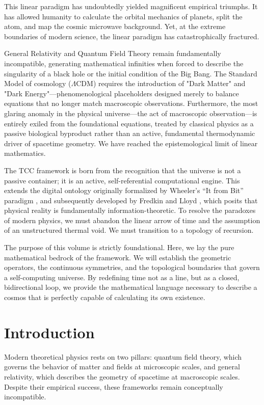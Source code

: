 \documentclass[12pt,openany]{book}
\theoremstyle{plain}
\theoremstyle{definition}
\theoremstyle{remark}
\begin{document}
This linear paradigm has undoubtedly yielded magnificent empirical triumphs. It has allowed humanity to calculate the orbital mechanics of planets, split the atom, and map the cosmic microwave background. Yet, at the extreme boundaries of modern science, the linear paradigm has catastrophically fractured.

General Relativity and Quantum Field Theory remain fundamentally incompatible, generating mathematical infinities when forced to describe the singularity of a black hole or the initial condition of the Big Bang. The Standard Model of cosmology ($\Lambda$CDM) requires the introduction of "Dark Matter" and "Dark Energy"---phenomenological placeholders designed merely to balance equations that no longer match macroscopic observations. Furthermore, the most glaring anomaly in the physical universe---the act of macroscopic observation---is entirely exiled from the foundational equations, treated by classical physics as a passive biological byproduct rather than an active, fundamental thermodynamic driver of spacetime geometry. We have reached the epistemological limit of linear mathematics. 

The TCC framework is born from the recognition that the universe is not a passive container; it is an active, self-referential computational engine. This extends the digital ontology originally formalized by Wheeler's ``It from Bit'' paradigm \cite{wheeler1990}, and subsequently developed by Fredkin \cite{fredkin1990} and Lloyd \cite{lloyd2006}, which posits that physical reality is fundamentally information-theoretic. To resolve the paradoxes of modern physics, we must abandon the linear arrow of time and the assumption of an unstructured thermal void. We must transition to a topology of recursion.

The purpose of this volume is strictly foundational. Here, we lay the pure mathematical bedrock of the framework. We will establish the geometric operators, the continuous symmetries, and the topological boundaries that govern a self-computing universe. By redefining time not as a line, but as a closed, bidirectional loop, we provide the mathematical language necessary to describe a cosmos that is perfectly capable of calculating its own existence.

\chapter{Introduction}

Modern theoretical physics rests on two pillars: quantum field theory, which
governs the behavior of matter and fields at microscopic scales, and general
relativity, which describes the geometry of spacetime at macroscopic scales.
Despite their empirical success, these frameworks remain conceptually
incompatible. 
\end{document}
